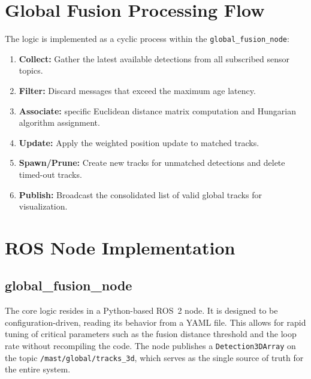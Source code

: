 \documentclass[12pt,a4paper]{report}
\begin{document}
{\section{Global Fusion Processing Flow}
The logic is implemented as a cyclic process within the \texttt{global\_fusion\_node}:
\begin{enumerate}
    \item \textbf{Collect:} Gather the latest available detections from all subscribed sensor topics.
    \item \textbf{Filter:} Discard messages that exceed the maximum age latency.
    \item \textbf{Associate:} specific Euclidean distance matrix computation and Hungarian algorithm assignment.
    \item \textbf{Update:} Apply the weighted position update to matched tracks.
    \item \textbf{Spawn/Prune:} Create new tracks for unmatched detections and delete timed-out tracks.
    \item \textbf{Publish:} Broadcast the consolidated list of valid global tracks for visualization.
\end{enumerate}

\section{ROS Node Implementation}

\subsection{global\_fusion\_node}
The core logic resides in a Python-based ROS~2 node. It is designed to be configuration-driven, reading its behavior from a YAML file. This allows for rapid tuning of critical parameters such as the fusion distance threshold and the loop rate without recompiling the code. The node publishes a \texttt{Detection3DArray} on the topic \texttt{/mast/global/tracks\_3d}, which serves as the single source of truth for the entire system.

}
\end{document}
